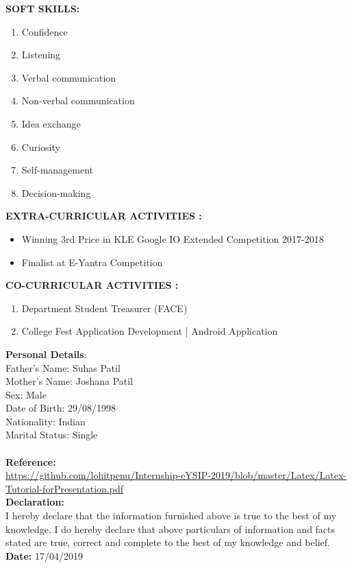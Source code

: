 \documentclass{article}
\begin{document}
\large \textbf{SOFT SKILLS:}	
	\begin{enumerate}
	\item Confidence
	\item Listening
	\item Verbal communication
	\item Non-verbal communication
	\item Idea exchange
	\item Curiosity
	\item Self-management
	\item Decision-making
\end{enumerate}

\large \textbf{EXTRA-CURRICULAR ACTIVITIES
:}\\
	\begin{itemize}
	\item Winning 3rd Price in KLE Google IO Extended Competition 2017-2018
	\item Finalist at E-Yantra Competition
\end{itemize}
\large \textbf{CO-CURRICULAR ACTIVITIES
:}\\
	\begin{enumerate}
	\item Department Student Treasurer (FACE)
	\item College Fest Application Development | Android Application
\end{enumerate}

\large \textbf{Personal Details}:\\
Father’s Name: Suhas Patil \\
Mother’s Name: Joshana Patil \\
Sex: Male \\
Date of Birth: 29/08/1998 \\
Nationality: Indian \\
Marital Status: Single \\
\\
\large \textbf{Reference:}\\
\href{Link}{https://github.com/lohitpenu/Internship-eYSIP-2019/blob/master/Latex/Latex-Tutorial-forPresentation.pdf} \\	

\large \textbf{Declaration: }\\
I hereby declare that the information furnished above is true to the best of my knowledge. I do hereby declare that above particulars of information and facts stated are true, correct and complete to the best of my knowledge and belief.\\

\large \textbf{Date: } 17/04/2019\\
\end{document}

